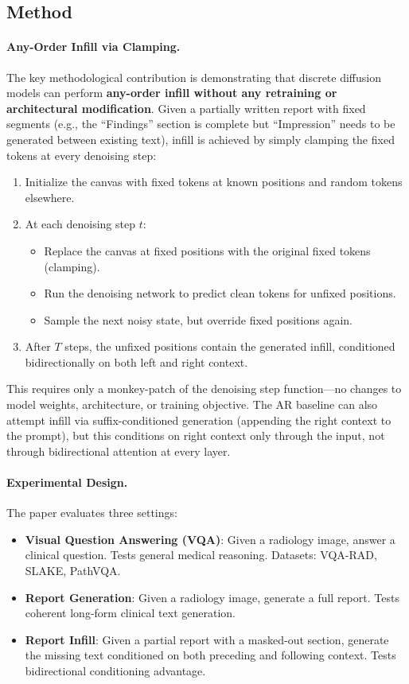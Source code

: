 \documentclass[11pt,a4paper]{article}
\begin{document}
\subsection{Method}

\paragraph{Any-Order Infill via Clamping.} The key methodological contribution is demonstrating that discrete diffusion models can perform \textbf{any-order infill without any retraining or architectural modification}. Given a partially written report with fixed segments (e.g., the ``Findings'' section is complete but ``Impression'' needs to be generated between existing text), infill is achieved by simply clamping the fixed tokens at every denoising step:

\begin{enumerate}
\item Initialize the canvas with fixed tokens at known positions and random tokens elsewhere.
\item At each denoising step $t$:
    \begin{itemize}
    \item Replace the canvas at fixed positions with the original fixed tokens (clamping).
    \item Run the denoising network to predict clean tokens for unfixed positions.
    \item Sample the next noisy state, but override fixed positions again.
    \end{itemize}
\item After $T$ steps, the unfixed positions contain the generated infill, conditioned bidirectionally on both left and right context.
\end{enumerate}

This requires only a monkey-patch of the denoising step function---no changes to model weights, architecture, or training objective. The AR baseline can also attempt infill via suffix-conditioned generation (appending the right context to the prompt), but this conditions on right context only through the input, not through bidirectional attention at every layer.

\paragraph{Experimental Design.} The paper evaluates three settings:
\begin{itemize}
\item \textbf{Visual Question Answering (VQA)}: Given a radiology image, answer a clinical question. Tests general medical reasoning. Datasets: VQA-RAD, SLAKE, PathVQA.
\item \textbf{Report Generation}: Given a radiology image, generate a full report. Tests coherent long-form clinical text generation.
\item \textbf{Report Infill}: Given a partial report with a masked-out section, generate the missing text conditioned on both preceding and following context. Tests bidirectional conditioning advantage.
\end{itemize}
\end{document}
